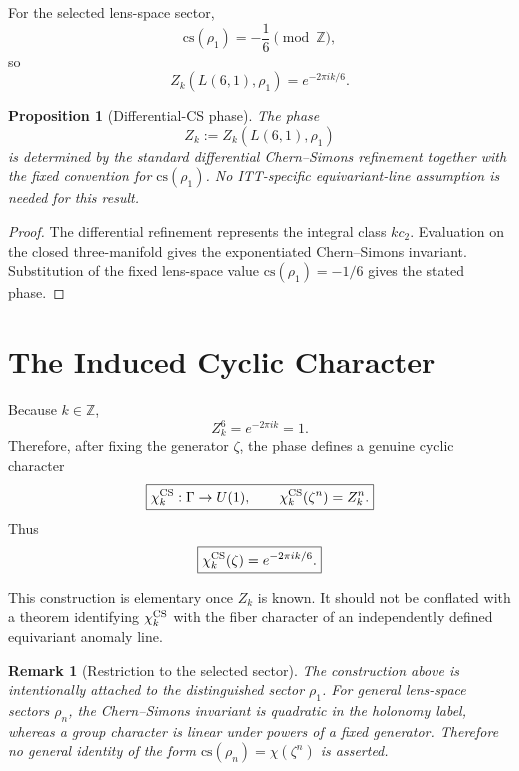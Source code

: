 \documentclass[11pt,a4paper]{article}
\newtheorem{proposition}[definition]{Proposition}
\newtheorem{remark}[definition]{Remark}
\begin{document}
For the selected lens-space sector,
\begin{equation}
\mathrm{cs}(\rho_1)=-\frac16\pmod{\mathbb Z},
\end{equation}
so
\begin{equation}
\boxed{
Z_k(L(6,1),\rho_1)=e^{-2\pi i k/6}.
}
\end{equation}

\begin{proposition}[Differential-CS phase]
The phase
\begin{equation}
Z_k:=Z_k(L(6,1),\rho_1)
\end{equation}
is determined by the standard differential Chern--Simons refinement together with the fixed convention for $\mathrm{cs}(\rho_1)$. No ITT-specific equivariant-line assumption is needed for this result.
\end{proposition}

\begin{proof}
The differential refinement represents the integral class $k c_2$. Evaluation on the closed three-manifold gives the exponentiated Chern--Simons invariant. Substitution of the fixed lens-space value $\mathrm{cs}(\rho_1)=-1/6$ gives the stated phase.
\end{proof}

\section{The Induced Cyclic Character}

Because $k\in\mathbb Z$,
\begin{equation}
Z_k^6=e^{-2\pi i k}=1.
\end{equation}
Therefore, after fixing the generator $\zeta$, the phase defines a genuine cyclic character
\begin{equation}
\boxed{
\chi_k^{\rm CS}:\Gamma\to U(1),
\qquad
\chi_k^{\rm CS}(\zeta^n)=Z_k^n.
}
\end{equation}
Thus
\begin{equation}
\boxed{
\chi_k^{\rm CS}(\zeta)=e^{-2\pi i k/6}.
}
\end{equation}

This construction is elementary once $Z_k$ is known. It should not be conflated with a theorem identifying $\chi_k^{\rm CS}$ with the fiber character of an independently defined equivariant anomaly line.

\begin{remark}[Restriction to the selected sector]
The construction above is intentionally attached to the distinguished sector $\rho_1$. For general lens-space sectors $\rho_n$, the Chern--Simons invariant is quadratic in the holonomy label, whereas a group character is linear under powers of a fixed generator. Therefore no general identity of the form $\mathrm{cs}(\rho_n)=\chi(\zeta^n)$ is asserted.
\end{remark}
\end{document}

